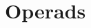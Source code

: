 \documentclass[11pt, reqno]{amsart}
\theoremstyle{definition}
\begin{document}



\section{Operads}
\end{document}
